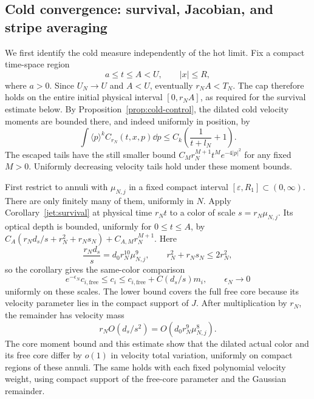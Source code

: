 \subsection{Cold convergence: survival, Jacobian, and stripe averaging}

We first identify the cold measure independently of the hot limit.
Fix a compact time-space region
\[
a\leq t\leq A<U,\qquad |x|\leq R,
\]
where \(a>0\). Since \(U_N\to U\) and \(A<U\), eventually
\(r_NA<T_N\). The cap therefore holds on the entire initial
physical interval \([0,r_NA]\), as required for the survival
estimate below.
By Proposition~\ref{prop:cold-control}, the dilated
cold velocity moments are bounded there, and indeed uniformly in
position, by
\begin{equation}\label{dil:cold-moment-bound}
\int\langle p\rangle^k C_{r_N}(t,x,p)\dd p
\leq C_k\left(\frac1{t+l_N}+1\right).
\end{equation}
The escaped tails have the still smaller bound
\(C_M r_N^{M+1}t^Me^{-4|p|^2}\) for any fixed \(M>0\).
Uniformly decreasing velocity tails hold under these moment bounds.

First restrict to annuli with \(\mu_{N,j}\) in a fixed compact
interval \([\varepsilon,R_1]\subset(0,\infty)\). There are only
finitely many of them, uniformly in \(N\). Apply
Corollary~\ref{jet:survival} at physical time \(r_Nt\) to a color
of scale \(s=r_N\mu_{N,j}\). Its optical depth is bounded,
uniformly for \(0\le t\le A\), by
\(C_A(r_Nd_s/s+r_N^2+r_Ns_N)+C_{A,M}r_N^{M+1}\). Here
\[
\frac{r_Nd_s}{s}=d_0r_N^{10}\mu_{N,j}^{9},\qquad
r_N^2+r_Ns_N\leq2r_N^2,
\]
so the corollary gives the same-color comparison
\[
e^{-\epsilon_N}c_{i,\mathrm{free}}\leq c_i
\leq c_{i,\mathrm{free}}+C(d_s/s)m_i,
\qquad \epsilon_N\longrightarrow0
\]
uniformly on these scales. The lower bound covers the full free core
because its velocity parameter lies in the compact support of \(J\).
After multiplication by \(r_N\), the remainder has velocity mass
\begin{equation}\label{dil:remainder-power}
r_N O(d_s/s^2)=O(d_0r_N^9\mu_{N,j}^8).
\end{equation}
The core moment bound and this estimate show that the dilated actual
color and its free core differ by
\(o(1)\) in velocity total variation, uniformly on compact regions
of these annuli. The same holds with each fixed polynomial velocity
weight, using compact support of the free-core parameter and the
Gaussian remainder.


